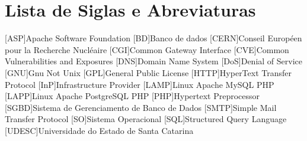 \chapter*{Lista de Siglas e Abreviaturas}
\begin{acronym}

[ASP]{Apache Software Foundation}
[BD]{Banco de dados}
[CERN]{Conseil Europ\'een pour la Recherche Nucl\'eaire}
[CGI]{Common Gateway Interface}
[CVE]{Common Vulnerabilities and Exposures}
[DNS]{Domain Name System}
[DoS]{Denial of Service}
[GNU]{Gnu Not Unix}
[GPL]{General Public License}
[HTTP]{HyperText Transfer Protocol}
[InP]{Infrastructure Provider}
[LAMP]{Linux Apache MySQL PHP}
[LAPP]{Linux Apache PostgreSQL PHP}
[PHP]{Hypertext Preprocessor}
[SGBD]{Sistema de Gerenciamento de Banco de Dados}
[SMTP]{Simple Mail Transfer Protocol}
[SO]{Sistema Operacional}
[SQL]{Structured Query Language}
[UDESC]{Universidade do Estado de Santa Catarina}
\begin{comment}
\acro{CLI}[CLI]{Command Line Interface}
\acro{CPU}[CPU]{Central Processing Unit}
\acro{DPCF}[DPCF]{Data Plane Control Function}
\acro{IETF}[IETF]{Internet Engineering Task Force}
\acro{IO}[I/O]{Input/Output}
\acro{LSD}[LSD]{Link State Database}
\acro{NFS}[NFS]{Network File System}
\acro{ONF}[ONF]{Open Networking Fundation}
\acro{OSPF}[OSPF]{Open Shortest Path First}
\acro{PRNG}[PRNG]{Pseudo-Random Number Generator}
\acro{QOS}[QOS]{Quality of Service}
\acro{RAM}[RAM]{Random Access Memory}
\acro{SDN}[SDN]{Software Defined Network}
\acro{SNMP}[SNMP]{Simple Network Management Protocol}
\end{comment}

\end{acronym}
